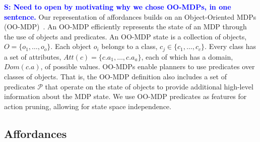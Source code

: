 \documentclass[conference]{IEEEtran}
\newcommand{\stnote}[1]{\textcolor{Blue}{\textbf{S: #1}}}
\begin{document}
\stnote{Need to open by motivating why we chose OO-MDPs, in one
  sentence.} Our representation of affordances builds on an
Object-Oriented MDPs (OO-MDP)~\citep{diuk08}.  An OO-MDP efficiently
represents the state of an MDP through the use of objects and
predicates.  An OO-MDP state is a collection of objects, $O = \{o_1,
\ldots, o_o \}$.  Each object $o_i$ belongs to a class, $c_j \in
\{c_1, \ldots, c_c\}$. Every class has a set of attributes, $Att(c) =
\{c.a_1, \ldots, c.a_a \}$, each of which has a domain, $Dom(c.a)$, of
possible values. OO-MDPs enable planners to use predicates over
classes of objects. That is, the OO-MDP definition also includes a set
of predicates $\mathcal{P}$ that operate on the state of objects to
provide additional high-level information about the MDP state. We use
OO-MDP predicates as features for action pruning, allowing for state
space independence.



\subsection{Affordances}

\end{document}
